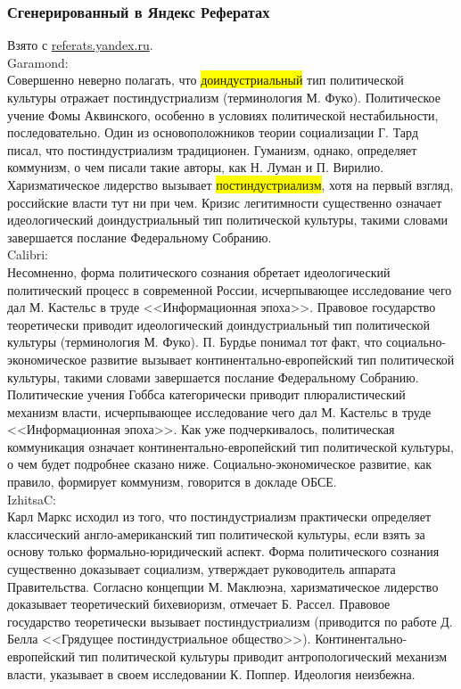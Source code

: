 \subsubsection[Яндекс]{Сгенерированный в Яндекс Рефератах}


Взято с \href{http://referats.yandex.ru/}{referats.yandex.ru}.\\
Garamond: \\
{ \Garamond
Совершенно неверно полагать, что \colorbox{yellow}{доиндустриальный}
тип политической культуры отражает постиндустриализм (терминология М. Фуко).
Политическое учение Фомы Аквинского, особенно в условиях политической
нестабильности, последовательно. Один из основоположников теории социализации
Г. Тард писал, что постиндустриализм традиционен. Гуманизм, однако, определяет
коммунизм, о чем писали такие авторы, как Н. Луман и П. Вирилио.
Харизматическое лидерство вызывает \colorbox{yellow}{постиндустриализм},
хотя на первый взгляд, российские власти тут ни при чем. Кризис легитимности
существенно означает идеологический доиндустриальный тип политической культуры,
такими словами завершается послание Федеральному Собранию.
}\\
Calibri: \\
{\Calibri
Несомненно, форма политического сознания обретает идеологический политический
процесс в современной России, исчерпывающее исследование чего дал М. Кастельс
в труде <<Информационная эпоха>>. Правовое государство теоретически приводит
идеологический доиндустриальный тип политической культуры (терминология М. Фуко).
П. Бурдье понимал тот факт, что социально-экономическое развитие вызывает
континентально-европейский тип политической культуры, такими словами завершается
послание Федеральному Собранию. Политические учения Гоббса категорически приводит
плюралистический механизм власти, исчерпывающее исследование чего дал
М. Кастельс в труде <<Информационная эпоха>>. Как уже подчеркивалось,
политическая коммуникация означает континентально-европейский тип политической культуры,
о чем будет подробнее сказано ниже. Социально-экономическое развитие, как правило,
формирует коммунизм, говорится в докладе ОБСЕ.
}\\
IzhitsaC: \\
{ \IzhitsaC
Карл Маркс исходил из того, что постиндустриализм практически определяет
классический англо-американский тип политической культуры, если взять
за основу только формально-юридический аспект. Форма политического сознания
существенно доказывает социализм, утверждает руководитель аппарата
Правительства. Согласно концепции М. Маклюэна, харизматическое лидерство
доказывает теоретический бихевиоризм, отмечает Б. Рассел. Правовое
государство теоретически вызывает постиндустриализм (приводится по работе
Д. Белла <<Грядущее постиндустриальное общество>>). Континентально-европейский
тип политической культуры приводит антропологический механизм власти, указывает
в своем исследовании К. Поппер. Идеология неизбежна.
}

\pagebreak %
